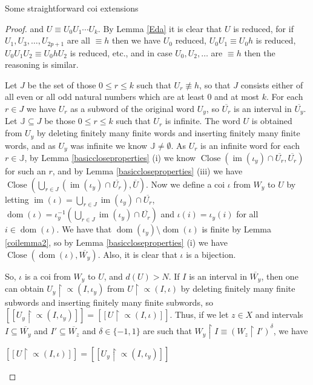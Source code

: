 \documentclass{amsart}
\theoremstyle{definition}\newtheorem{theorem}{Theorem}
\theoremstyle{definition}\newtheorem*{A}{Main Theorem}
\theoremstyle{definition}\newtheorem*{B}{Theorem \ref{elementaryequiv}}
\theoremstyle{definition}\newtheorem*{C}{Theorem \ref{continuous}}
\theoremstyle{definition}\newtheorem*{D}{Theorem \ref{bigisomorphism2}}
\theoremstyle{definition}\newtheorem{bigtheorem}{Main Theorem}
\numberwithin{theorem}{section}
\theoremstyle{definition}\newtheorem{corollary}[theorem]{Corollary}
\theoremstyle{definition}\newtheorem{proposition}[theorem]{Proposition}
\theoremstyle{definition}\newtheorem{definition}[theorem]{Definition}
\theoremstyle{definition}\newtheorem{question}[theorem]{Question}
\theoremstyle{definition}\newtheorem{example}[theorem]{Example}
\theoremstyle{definition}\newtheorem{remark}[theorem]{Remark}
\theoremstyle{definition}\newtheorem{note}[theorem]{Note}
\theoremstyle{definition}\newtheorem{lemma}[theorem]{Lemma}
\theoremstyle{definition}\newtheorem{fact}[theorem]{Fact}
\theoremstyle{definition}\newtheorem{define}[theorem]{Definition}
\theoremstyle{definition}\newtheorem{claim}[theorem]{Claim}
\theoremstyle{definition}\newtheorem{obs}[theorem]{Observation}
\theoremstyle{definition}\newtheorem{definitions}[theorem]{Definitions}
\newcommand{\im}{\operatorname{im}}
\newcommand{\Close}{\operatorname{Close}}
\newcommand{\dom}{\operatorname{dom}}
\begin{document}
\begin{section}{Some straightforward coi extensions}
\begin{proof}
\noindent and $U \equiv U_0U_1\cdots U_k$.  By Lemma \ref{Eda} it is clear that $U$ is reduced, for if $U_1, U_3, \ldots, U_{2p+1}$ are all $\equiv h$ then we have $U_0$ reduced, $U_0U_1 \equiv U_0h$ is reduced, $U_0U_1U_2 \equiv U_0hU_2$ is reduced, etc., and in case $U_0, U_2, \ldots$ are $\equiv h$ then the reasoning is similar.  

Let $J$ be the set of those $0 \leq r \leq k$ such that $U_r \not\equiv h$, so that $J$ consists either of all even or all odd natural numbers which are at least $0$ and at most $k$.  For each $r \in J$ we have $U_r$ as a subword of the original word $U_y$, so $\overline{U_r}$ is an interval in $\overline{U_y}$.  Let $\mathbb{J} \subseteq J$ be those $0 \leq r \leq k$ such that $U_r$ is infinite.  The word $U$ is obtained from $U_y$ by deleting finitely many finite words and inserting finitely many finite words, and as $U_y$ was infinite we know $\mathbb{J} \neq \emptyset$.  As $U_r$ is an infinite word for each $r \in \mathbb{J}$, by Lemma \ref{basiccloseproperties} (i) we know $\Close(\im(\iota_y) \cap \overline{U_r}, \overline{U_r})$ for such an $r$, and by Lemma \ref{basiccloseproperties} (iii) we have $\Close(\bigcup_{r \in J} (\im(\iota_y) \cap \overline{U_r}), \overline{U})$.  Now we define a coi $\iota$ from $W_y$ to $U$ by letting $\im(\iota) = \bigcup_{r \in J} \im(\iota_y) \cap \overline{U_r}$, $\dom(\iota) = \iota_y^{-1}(\bigcup_{r \in J} \im(\iota_y) \cap \overline{U_r})$ and $\iota(i) = \iota_y(i)$ for all $i \in \dom(\iota)$.  We have that $\dom(\iota_y) \setminus \dom(\iota)$ is finite by Lemma \ref{coilemma2}, so by Lemma \ref{basiccloseproperties} (i) we have $\Close(\dom(\iota), \overline{W_y})$.  Also, it is clear that $\iota$ is a bijection.

So, $\iota$ is a coi from $W_y$ to $U$, and $d(U) > N$.  If $I$ is an interval in $\overline{W_y}$, then one can obtain $U_y \upharpoonright \varpropto(I, \iota_y)$ from $U \upharpoonright \varpropto(I, \iota)$ by deleting finitely many finite subwords and inserting finitely many finite subwords, so $[[U_y \upharpoonright \varpropto(I, \iota_y)]] = [[U \upharpoonright \varpropto(I, \iota)]]$.  Thus, if we let $z \in X$ and intervals $I \subseteq \overline{W_y}$ and $I' \subseteq \overline{W_z}$ and $\delta \in \{-1, 1\}$ are such that $W_y \upharpoonright I \equiv (W_z \upharpoonright I')^{\delta}$, we have 

\begin{center}
$[[U \upharpoonright \varpropto(I, \iota)]] = [[U_y \upharpoonright \varpropto(I, \iota_y)]]$


\end{center}
\end{proof}
\end{section}
\end{document}
